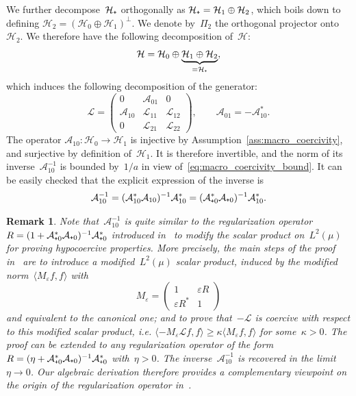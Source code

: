 \documentclass{article}
\newtheorem{remark}{Remark}
\newcommand{\cL}{\mathcal{L}}
\newcommand{\cLa}{\mathcal{A}}
\newcommand{\cH}{\mathcal{H}}
\newcommand{\subplus}{\textnormal{\texttt{+}}}
\renewcommand{\geq}{\geqslant}
\begin{document}
We further decompose~$\cH_\subplus$ orthogonally as $\cH_\subplus = \cH_1 \oplus \cH_2$, which boils down to defining $\cH_2 = (\cH_0 \oplus \cH_1)^\perp$. We denote by~$\Pi_{2}$ the orthogonal projector onto~$\cH_2$. We therefore have the following decomposition of~$\cH$:
\begin{align*}
  \cH = \cH_{0} \oplus \underbrace{\cH_{1} \oplus \cH_{2}}_{=\cH_{\subplus}},
\end{align*}
which induces the following decomposition of the generator:
\[
  \cL = \begin{pmatrix} 0 & \cLa_{01} & 0 \\
    \cLa_{10} & \cL_{11} & \cL_{12} \\
    0 & \cL_{21} & \cL_{22}
  \end{pmatrix},
  \qquad
  \cLa_{01} = -\cLa_{10}^{*}.
\]
The operator $\cLa_{10}:\cH_0\to\cH_1$ is injective by
Assumption~\ref{ass:macro_coercivity}, and surjective by definition
of~$\cH_{1}$. It is therefore invertible, and the norm of its
inverse~$\cLa_{10}^{-1}$ is bounded by~$1/a$ in view
of~\eqref{eq:macro_coercivity_bound}. It can be easily checked that the explicit expression of the inverse is
\begin{align*}
  \cLa_{10}^{-1} = (\cLa_{10}^{*}\cLa_{10})^{-1} \cLa_{10}^{*} = (\cLa_{\subplus0}^{*}\cLa_{\subplus0})^{-1} \cLa_{10}^{*}.
\end{align*}

\begin{remark}
  Note that~$\cLa_{10}^{-1}$ is quite similar to the regularization operator $R = (1+\cLa_{\subplus0}^*\cLa_{\subplus0})^{-1}\cLa_{\subplus 0}^*$ introduced in~\cite{Herau06,DMS09,DMS15} to modify the scalar product on~$L^2(\mu)$ for proving hypocoercive properties. More precisely, the main steps of the proof in~\cite{DMS09,DMS15} are to introduce a modified~$L^2(\mu)$ scalar product, induced by the modified norm~$\langle M_\varepsilon f, f \rangle$ with
  \[
  M_\varepsilon = \begin{pmatrix}
    1 & \varepsilon R\\
    \varepsilon R^* & 1
  \end{pmatrix}
  \]
  and equivalent to the canonical one; and to prove that~$-\cL$ is coercive with respect to this modified scalar product, \emph{i.e.} $\langle -M_\varepsilon\cL f, f\rangle \geq \kappa \langle M_\varepsilon f,f\rangle$ for some~$\kappa>0$. The proof can be extended to any regularization operator of the form $R = (\eta+\cLa_{\subplus0}^*\cLa_{\subplus0})^{-1}\cLa_{\subplus 0}^*$ with~$\eta>0$. The inverse~$\cLa_{10}^{-1}$ is recovered in the limit~$\eta \to 0$. Our algebraic derivation therefore provides a complementary viewpoint on the origin of the regularization operator in~\cite{Herau06,DMS09,DMS15}.
\end{remark}
\end{document}
